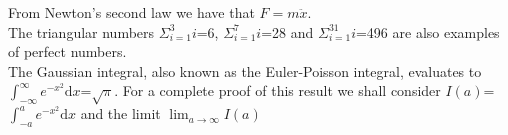 \documentclass[12pt]{report}
\newcommand{\newt}{$F = m \ddot{x}$}
\newcommand{\triang}[1]{$\Sigma_{i=1}^{#1} i$}
\newcommand{\gauss}[1][\infty]{$\int_{-#1}^{#1} e^{-x^2} \textrm{d}x$}
\begin{document}
From Newton's second law we have that \newt.\\

The triangular numbers \triang{3}=6, \triang{7}=28 and
\triang{31}=496 are also examples of perfect numbers.\\

The Gaussian integral, also known as the Euler-Poisson
integral, evaluates to \gauss=$\sqrt{\pi}$. For a complete proof
of this result we shall consider $I(a)$=\gauss[a] and the limit
$\lim_{a\rightarrow\infty} I(a)$
\end{document}

